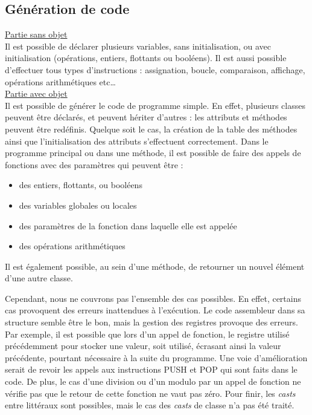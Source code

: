 \documentclass{article}
\begin{document}
\subsection{Génération de code}
\underline{Partie sans objet} \newline
\\
Il est possible de déclarer plusieurs variables, sans initialisation, ou avec initialisation (opérations, entiers, flottants ou booléens).
Il est aussi possible d’effectuer tous types d’instructions : assignation, boucle, comparaison, affichage, opérations arithmétiques etc… \newline
\\
\underline{Partie avec objet} \newline
\\
Il est possible de générer le code de programme simple.\newline
En effet, plusieurs classes peuvent être déclarés, et peuvent hériter d’autres : les attributs et méthodes peuvent être redéfinis.
Quelque soit le cas, la création de la table des méthodes ainsi que l'initialisation des attributs s’effectuent correctement.
Dans le programme principal ou dans une méthode, il est possible de faire des appels de fonctions avec des paramètres qui peuvent être :
\begin{itemize}
\item des entiers, flottants, ou booléens
\item des variables globales ou locales
\item des paramètres de la fonction dans laquelle elle est appelée
\item des opérations arithmétiques
\end{itemize}
Il est également possible, au sein d’une méthode, de retourner un nouvel élément d’une autre classe.

Cependant, nous ne couvrons pas l’ensemble des cas possibles. En effet, certains cas provoquent des erreurs inattendues à l'exécution.
Le code assembleur dans sa structure semble être le bon, mais la gestion des registres provoque des erreurs.
Par exemple, il est possible que lors d’un appel de fonction, le registre utilisé précédemment pour stocker une valeur, soit utilisé, écrasant ainsi la valeur précédente, pourtant nécessaire à la suite du programme. Une voie d’amélioration serait de revoir les appels aux instructions PUSH et POP qui sont faits dans le code.
\newline
De plus, le cas d’une division ou d’un modulo par un appel de fonction ne vérifie pas que le retour de cette fonction ne vaut pas zéro. \newline
Pour finir, les \textit{casts} entre littéraux sont possibles, mais le cas des \textit{casts} de classe n'a pas été traité.
\end{document}
